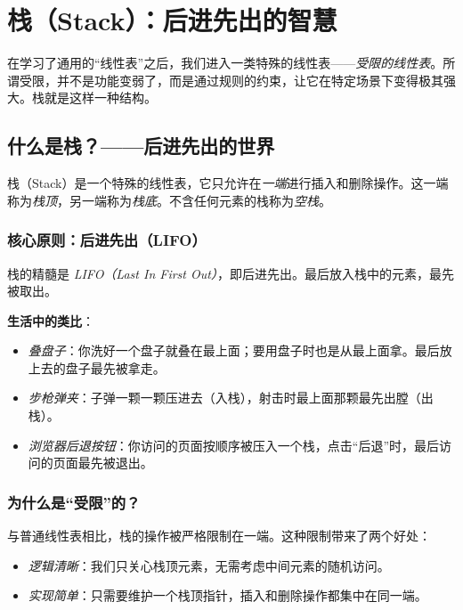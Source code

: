 \chapter{栈（Stack）：后进先出的智慧}

在学习了通用的“线性表”之后，我们进入一类特殊的线性表——\emph{受限的线性表}。所谓受限，并不是功能变弱了，而是通过规则的约束，让它在特定场景下变得极其强大。栈就是这样一种结构。

\section{什么是栈？——后进先出的世界}

栈（Stack）是一个特殊的线性表，它只允许在\emph{一端}进行插入和删除操作。这一端称为\emph{栈顶}，另一端称为\emph{栈底}。不含任何元素的栈称为\emph{空栈}。

\subsection{核心原则：后进先出（LIFO）}

栈的精髓是 \emph{LIFO（Last In First Out）}，即后进先出。最后放入栈中的元素，最先被取出。

\textbf{生活中的类比}：

\begin{itemize}
    \item \emph{叠盘子}：你洗好一个盘子就叠在最上面；要用盘子时也是从最上面拿。最后放上去的盘子最先被拿走。
    \item \emph{步枪弹夹}：子弹一颗一颗压进去（入栈），射击时最上面那颗最先出膛（出栈）。
    \item \emph{浏览器后退按钮}：你访问的页面按顺序被压入一个栈，点击“后退”时，最后访问的页面最先被退出。
\end{itemize}

\subsection{为什么是“受限”的？}

与普通线性表相比，栈的操作被严格限制在一端。这种限制带来了两个好处：

\begin{itemize}
    \item \emph{逻辑清晰}：我们只关心栈顶元素，无需考虑中间元素的随机访问。
    \item \emph{实现简单}：只需要维护一个栈顶指针，插入和删除操作都集中在同一端。
\end{itemize}

